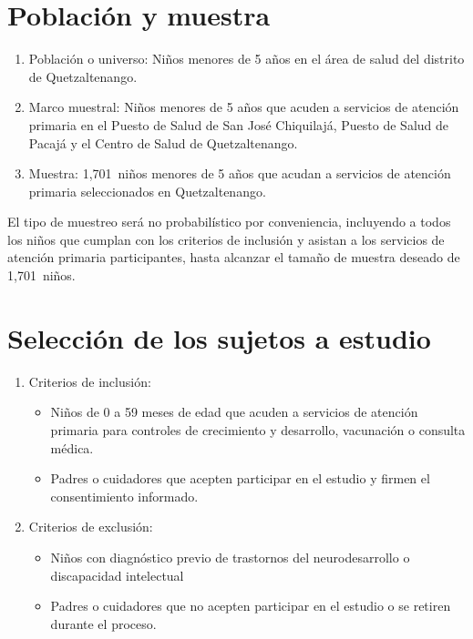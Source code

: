 \documentclass[11pt,letterpaper]{report}
\newcommand{\tiempito}{durante mayo de 2025}
\newcommand{\muestradeseada}{1,701}
\begin{document}
\section{Población y muestra}
	\begin{enumerate}
		\item Población o universo: Niños menores de 5 años en el área de salud
		del distrito de Quetzaltenango.
		\item Marco muestral: Niños menores de 5 años que acuden a servicios de
		atención primaria en el Puesto de Salud de San José Chiquilajá, Puesto
		de Salud de Pacajá y el Centro de Salud de Quetzaltenango. %
		\item Muestra: \muestradeseada\ niños menores de 5 años que acudan a
		servicios de atención primaria seleccionados en Quetzaltenango.
	\end{enumerate}

El tipo de muestreo será no probabilístico por conveniencia, incluyendo a todos
los niños que cumplan con los criterios de inclusión y asistan a los servicios
de atención primaria participantes, hasta alcanzar el tamaño
de muestra deseado de \muestradeseada\ niños.

\section{Selección de los sujetos a estudio}
	\begin{enumerate}
		\item Criterios de inclusión:
			\begin{itemize}
				\item Niños de 0 a 59 meses de edad que acuden a servicios de
				atención primaria para controles de crecimiento y desarrollo,
				vacunación o consulta médica.
				\item Padres o cuidadores que acepten participar en el estudio
				y firmen el consentimiento informado.
			\end{itemize}
		\item Criterios de exclusión:
			\begin{itemize}
				\item Niños con diagnóstico previo de trastornos del
				neurodesarrollo o discapacidad intelectual
				\item Padres o cuidadores que no acepten participar en el
				estudio o se retiren durante el proceso.
			\end{itemize}
	\end{enumerate}
\end{document}
